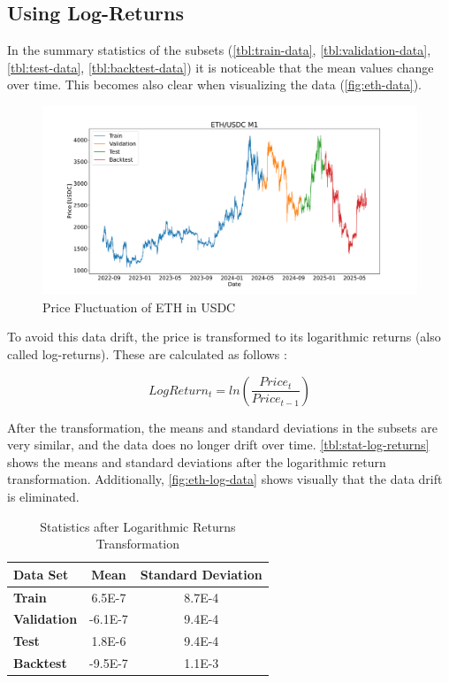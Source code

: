 \subsection{Using Log-Returns}
\label{chap:log-returns}

In the summary statistics of the subsets (\autoref{tbl:train-data}, \autoref{tbl:validation-data}, \autoref{tbl:test-data}, \autoref{tbl:backtest-data}) it is noticeable that the mean values change over time.
This becomes also clear when visualizing the data (\autoref{fig:eth-data}).

\begin{figure}[H]
    \centering
    \includegraphics[width=\textwidth]{images/eda/ethusdc_price}
    \caption{Price Fluctuation of ETH in USDC}
    \label{fig:eth-data}
\end{figure}

\noindent
To avoid this data drift, the price is transformed to its logarithmic returns (also called log-returns).
These are calculated as follows \cite{log-returns}:

\[
    LogReturn_t = ln(\frac{Price_t}{Price_{t-1}})
\]

\noindent
After the transformation, the means and standard deviations in the subsets are very similar, and the data does no longer drift over time.
\autoref{tbl:stat-log-returns} shows the means and standard deviations after the logarithmic return transformation.
Additionally, \autoref{fig:eth-log-data} shows visually that the data drift is eliminated.

\begin{table}[H]
    \centering
    \begin{tabular}{L{3cm}cc}
        \toprule
        \textbf{Data Set}   & Mean    & Standard Deviation \\
        \midrule
        \textbf{Train}      & 6.5E-7  & 8.7E-4             \\
        \textbf{Validation} & -6.1E-7 & 9.4E-4             \\
        \textbf{Test}       & 1.8E-6  & 9.4E-4             \\
        \textbf{Backtest}   & -9.5E-7 & 1.1E-3             \\
        \bottomrule
    \end{tabular}
    \caption{Statistics after Logarithmic Returns Transformation}
    \label{tbl:stat-log-returns}
\end{table}

